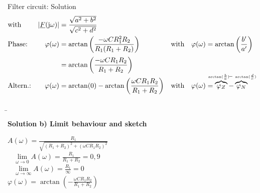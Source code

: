 \begin{frame}[allowframebreaks]
\begin{expl}{Filter circuit: Solution}{}
\begin{align*}
            &\text{with}&
            |\underline{F}(\mathrm{j}\omega)| &= \frac{\sqrt{a^2+b^2}}{\sqrt{c^2+d^2}}\\
        &\text{Phase:}&
            \varphi(\omega) &= \arctan\left(\frac{-\omega C R_1^2R_2}{R_1(R_1+R_2)}\right)&
            &\text{with}&
            \varphi(\omega) &= \arctan\left(\frac{b'}{a'}\right)\\[+2pt]
        &&
            &= \arctan\left(\frac{-\omega C R_1R_2}{R_1+R_2}\right)\\[-4pt]
        &\text{Altern.:}&
            \varphi(\omega ) &= \arctan(0) - \arctan\left(\frac{\omega CR_1R_2}{R_1+R_2}\right)&
            &\text{with}&
            \varphi(\omega) &= \overbrace{\varphi_{Z}}^{\mathclap{\scriptscriptstyle{\arctan(\frac{b}{a})}\ \ }} - \overbrace{\varphi_{N}}^{\mathclap{\ -\ \scriptscriptstyle{\arctan(\frac{d}{c})}}}
    \end{align*}

\b{\framebreak}%

\textbf{Solution b) Limit behaviour and sketch}

    \noindent%
    \begin{minipage}{\textwidth}
        \begin{minipage}[c][6cm][c]{0.48\textwidth}

            $A(\omega) = \frac{R_1}{\sqrt{(R_1+R_2)^2+(\omega CR_1R_2)^2}}$ \\

            \qquad $\ \ \ \ \lim \limits_{\omega \to 0} A(\omega) = \frac{R_1}{R_1+R_2} = 0,9$\\
            
            \qquad $\ \ \ \ \lim \limits_{\omega \to \infty} A(\omega) = \frac{R_1}{\infty} = 0$\\
            
            $\varphi(\omega) = \arctan(-\frac{\omega CR_1R_2}{R_1+R_2})$\\


\end{minipage}
\end{minipage}
\end{expl}
\end{frame}
